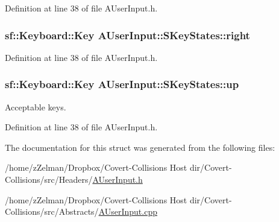 Definition at line 38 of file A\-User\-Input.\-h.

\hypertarget{structAUserInput_1_1SKeyStates_aa9551aac4a89e8c78e20d4a12a8afcee}{
\subsubsection[{right}]{\setlength{\rightskip}{0pt plus 5cm}sf\-::\-Keyboard\-::\-Key A\-User\-Input\-::\-S\-Key\-States\-::right}}\label{structAUserInput_1_1SKeyStates_aa9551aac4a89e8c78e20d4a12a8afcee}


Definition at line 38 of file A\-User\-Input.\-h.

\hypertarget{structAUserInput_1_1SKeyStates_a738215f9ee9440c8f11aa0a10fa83d42}{
\subsubsection[{up}]{\setlength{\rightskip}{0pt plus 5cm}sf\-::\-Keyboard\-::\-Key A\-User\-Input\-::\-S\-Key\-States\-::up}}\label{structAUserInput_1_1SKeyStates_a738215f9ee9440c8f11aa0a10fa83d42}


Acceptable keys. 



Definition at line 38 of file A\-User\-Input.\-h.



The documentation for this struct was generated from the following files\-:\begin{DoxyCompactItemize}
\item 
/home/z\-Zelman/\-Dropbox/\-Covert-\/\-Collisions Host dir/\-Covert-\/\-Collisions/src/\-Headers/\hyperlink{AUserInput_8h}{A\-User\-Input.\-h}\item 
/home/z\-Zelman/\-Dropbox/\-Covert-\/\-Collisions Host dir/\-Covert-\/\-Collisions/src/\-Abstracts/\hyperlink{AUserInput_8cpp}{A\-User\-Input.\-cpp}\end{DoxyCompactItemize}

